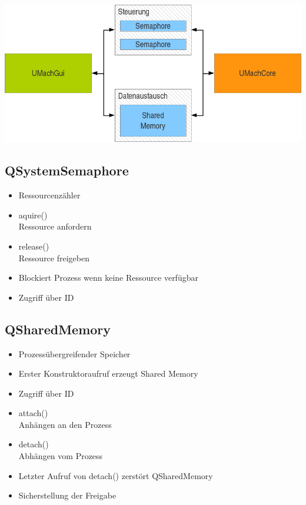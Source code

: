 \begin{frame}{\insertsubsection}
    \includegraphics[width=\textwidth]{g1}
\end{frame}

\subsection{QSystemSemaphore}

\begin{frame}{\insertsubsection}
    \begin{itemize}
         \item Ressourcenzähler
         \item aquire()\\
         Ressource anfordern
         \item release()\\
         Ressource freigeben
         \item Blockiert Prozess wenn keine Ressource verfügbar
         \item Zugriff über ID
    \end{itemize}
\end{frame}

\subsection{QSharedMemory}

\begin{frame}{\insertsubsection}
    \begin{itemize}
         \item Prozessübergreifender Speicher
         \item Erster Konstruktoraufruf erzeugt Shared Memory
         \item Zugriff über ID
         \item attach()\\
         Anhängen an den Prozess
         \item detach()\\
         Abhängen vom Prozess
         \item Letzter Aufruf von detach() zerstört QSharedMemory
         \item Sicherstellung der Freigabe
    \end{itemize}
\end{frame}

